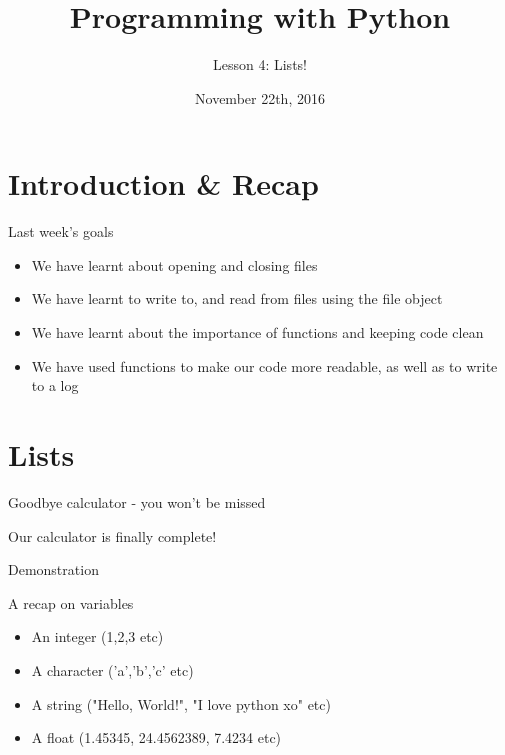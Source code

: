\documentclass{beamer}
\title{Programming with Python}
\subtitle{Lesson 4: Lists!}
\date{November 22th, 2016}
\begin{document}
\begin{frame}
  \titlepage
\end{frame}


\section{Introduction \& Recap}

\begin{frame}{Last week's goals}
\pause
\begin{itemize}
  \item We have learnt about opening and closing files
  \pause
  \item We have learnt to write to, and read from files using the file object
  \pause
  \item We have learnt about the importance of functions and keeping code clean
  \pause
  \item We have used functions to make our code more readable, as well as to write to a log
\end{itemize}
  
\end{frame}

\section{Lists}

\begin{frame}{Goodbye calculator - you won't be missed}

Our calculator is finally complete!

\pause

Demonstration

\end{frame}

\begin{frame}{A recap on variables}

\begin{itemize}
  \item An integer (1,2,3 etc) \pause
  \item A character ('a','b','c' etc) \pause
  \item A string ("Hello, World!", "I love python xo" etc) \pause
  \item A float (1.45345, 24.4562389, 7.4234 etc) \pause
\end{itemize}

\end{frame}
\end{document}
